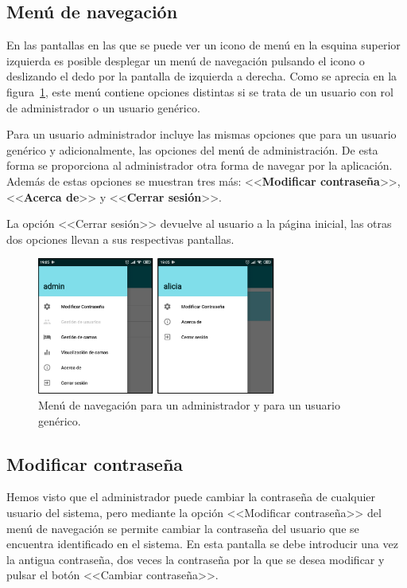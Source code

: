 \subsection{Menú de navegación}

En las pantallas en las que se puede ver un icono de menú en la esquina superior izquierda es posible desplegar un menú de navegación pulsando el icono o deslizando el dedo por la pantalla de izquierda a derecha. Como se aprecia en la figura~\ref{fig:menunavegacion}, este menú contiene opciones distintas si se trata de un usuario con rol de administrador o un usuario genérico. 

Para un usuario administrador incluye las mismas opciones que para un usuario genérico y adicionalmente, las opciones del menú de administración. De esta forma se proporciona al administrador otra forma de navegar por la aplicación. Además de estas opciones se muestran tres más: <<\textbf{Modificar contraseña}>>, <<\textbf{Acerca de}>> y <<\textbf{Cerrar sesión}>>. 

La opción <<Cerrar sesión>> devuelve al usuario a la página inicial, las otras dos opciones llevan a sus respectivas pantallas.  

\begin{figure}[H]
	\centering
	\includegraphics[width=0.7\textwidth]{../img/menunavegacion.png}
	\caption{Menú de navegación para un administrador y para un usuario genérico.}
	\label{fig:menunavegacion}
\end{figure} 

\subsection{Modificar contraseña}

Hemos visto que el administrador puede cambiar la contraseña de cualquier usuario del sistema, pero mediante la opción <<Modificar contraseña>> del menú de navegación se permite cambiar la contraseña del usuario que se encuentra identificado en el sistema. En esta pantalla se debe introducir una vez la antigua contraseña, dos veces la contraseña por la que se desea modificar y pulsar el botón <<Cambiar contraseña>>. 

